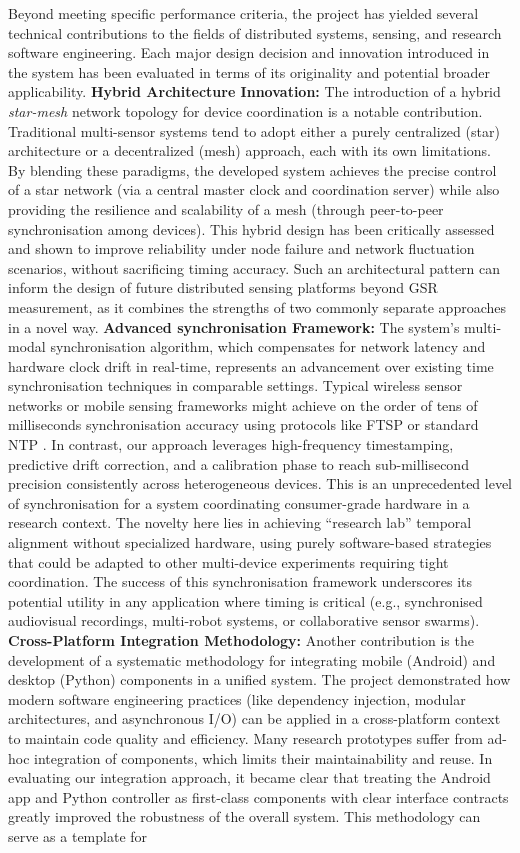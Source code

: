 \documentclass[11pt,a4paper]{report}
\begin{document}
{Beyond meeting specific performance criteria, the project has yielded several technical contributions to the fields of distributed systems, sensing, and research software engineering. Each major design decision and innovation introduced in the system has been evaluated in terms of its originality and potential broader applicability. \textbf{Hybrid Architecture Innovation:} The introduction of a hybrid \textit{star-mesh} network topology for device coordination is a notable contribution. Traditional multi-sensor systems tend to adopt either a purely centralized (star) architecture or a decentralized (mesh) approach, each with its own limitations. By blending these paradigms, the developed system achieves the precise control of a star network (via a central master clock and coordination server) while also providing the resilience and scalability of a mesh (through peer-to-peer synchronisation among devices). This hybrid design has been critically assessed and shown to improve reliability under node failure and network fluctuation scenarios, without sacrificing timing accuracy. Such an architectural pattern can inform the design of future distributed sensing platforms beyond GSR measurement, as it combines the strengths of two commonly separate approaches in a novel way. \textbf{Advanced synchronisation Framework:} The system’s multi-modal synchronisation algorithm, which compensates for network latency and hardware clock drift in real-time, represents an advancement over existing time synchronisation techniques in comparable settings. Typical wireless sensor networks or mobile sensing frameworks might achieve on the order of tens of milliseconds synchronisation accuracy using protocols like FTSP or standard NTP \cite{Maroti2004}. In contrast, our approach leverages high-frequency timestamping, predictive drift correction, and a calibration phase to reach sub-millisecond precision consistently across heterogeneous devices. This is an unprecedented level of synchronisation for a system coordinating consumer-grade hardware in a research context. The novelty here lies in achieving “research lab” temporal alignment without specialized hardware, using purely software-based strategies that could be adapted to other multi-device experiments requiring tight coordination. The success of this synchronisation framework underscores its potential utility in any application where timing is critical (e.g., synchronised audiovisual recordings, multi-robot systems, or collaborative sensor swarms). \textbf{Cross-Platform Integration Methodology:} Another contribution is the development of a systematic methodology for integrating mobile (Android) and desktop (Python) components in a unified system. The project demonstrated how modern software engineering practices (like dependency injection, modular architectures, and asynchronous I/O) can be applied in a cross-platform context to maintain code quality and efficiency. Many research prototypes suffer from ad-hoc integration of components, which limits their maintainability and reuse. In evaluating our integration approach, it became clear that treating the Android app and Python controller as first-class components with clear interface contracts greatly improved the robustness of the overall system. This methodology can serve as a template for }
\end{document}
